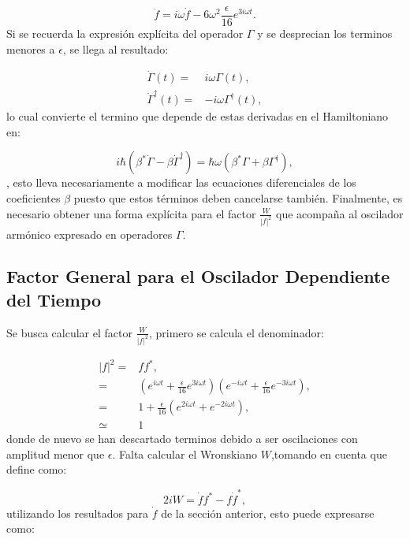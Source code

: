 \documentclass[a4paper,10pt]{report}
\begin{document}
\begin{equation}
\ddot{f} = i\omega\dot{f} - 6\omega^2\frac{\epsilon}{16} e^{3i\omega t}.
\end{equation}Si se recuerda la expresión explícita del operador $\Gamma$ y se desprecian los terminos menores a $\epsilon$, se llega al resultado:

\begin{align}
\dot{\Gamma}(t) =& i\omega \Gamma(t),\\
\dot{\Gamma}^\dagger(t) =& -i\omega \Gamma^\dagger(t),
\end{align} lo cual convierte el termino que depende de estas derivadas en el Hamiltoniano en:

\begin{equation}
i\hbar(\beta^*\dot{\Gamma}-\beta\dot{\Gamma}^\dagger) = \hbar\omega(\beta^*\Gamma+\beta\Gamma^{\dagger}),
\end{equation}, esto lleva necesariamente a modificar las ecuaciones diferenciales de los coeficientes $\beta$ puesto que estos términos deben cancelarse también. Finalmente, es necesario obtener una forma explícita para el factor $\frac{W}{|f|^2}$ que acompaña al oscilador armónico expresado en operadores $\Gamma$.

\subsection{Factor General para el Oscilador Dependiente del Tiempo}

Se busca calcular el factor $\frac{W}{|f|^2}$, primero se calcula el denominador:

\begin{align*}
|f|^2=&ff^*,\\
=& (e^{i\omega t} + \frac{\epsilon}{16} e^{3i\omega t})(e^{-i\omega t} + \frac{\epsilon}{16} e^{-3i\omega t}),\\
=& 1+\frac{\epsilon}{16}(e^{2i\omega t}+e^{-2i\omega t}),\\
\simeq & 1
\end{align*} donde de nuevo se han descartado terminos debido a ser oscilaciones con amplitud menor que $\epsilon$. Falta calcular el Wronskiano $W$,tomando en cuenta que \cite{BrownPT} define como:

\begin{equation}
2iW = \dot{f}f^* - f\dot{f}^*,
\end{equation} utilizando los resultados para $\dot{f}$ de la sección anterior, esto puede expresarse como:
\end{document}
